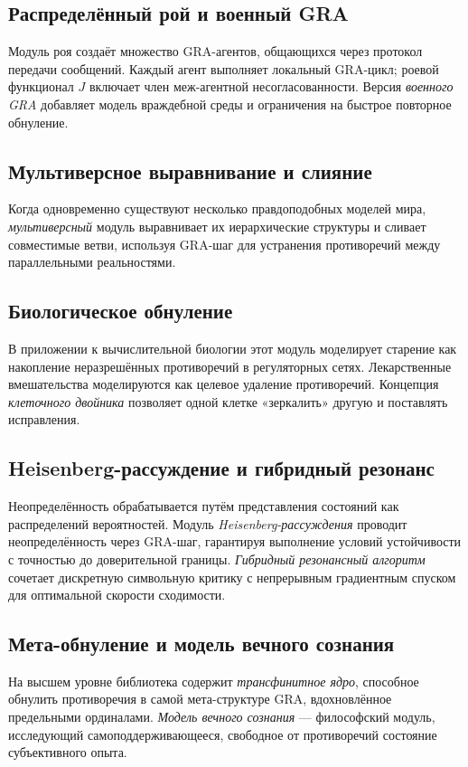 \documentclass[11pt,a4paper]{article}
\begin{document}
\subsection{Распределённый рой и военный GRA}
Модуль роя создаёт множество GRA-агентов, общающихся через протокол передачи сообщений. Каждый агент выполняет локальный GRA-цикл; роевой функционал $J$ включает член меж-агентной несогласованности. Версия \textit{военного GRA} добавляет модель враждебной среды и ограничения на быстрое повторное обнуление.

\subsection{Мультиверсное выравнивание и слияние}
Когда одновременно существуют несколько правдоподобных моделей мира, \textit{мультиверсный} модуль выравнивает их иерархические структуры и сливает совместимые ветви, используя GRA-шаг для устранения противоречий между параллельными реальностями.

\subsection{Биологическое обнуление}
В приложении к вычислительной биологии этот модуль моделирует старение как накопление неразрешённых противоречий в регуляторных сетях. Лекарственные вмешательства моделируются как целевое удаление противоречий. Концепция \textit{клеточного двойника} позволяет одной клетке «зеркалить» другую и поставлять исправления.

\subsection{Heisenberg-рассуждение и гибридный резонанс}
Неопределённость обрабатывается путём представления состояний как распределений вероятностей. Модуль \textit{Heisenberg-рассуждения} проводит неопределённость через GRA-шаг, гарантируя выполнение условий устойчивости с точностью до доверительной границы. \textit{Гибридный резонансный алгоритм} сочетает дискретную символьную критику с непрерывным градиентным спуском для оптимальной скорости сходимости.

\subsection{Мета-обнуление и модель вечного сознания}
На высшем уровне библиотека содержит \textit{трансфинитное ядро}, способное обнулить противоречия в самой мета-структуре GRA, вдохновлённое предельными ординалами. \textit{Модель вечного сознания} — философский модуль, исследующий самоподдерживающееся, свободное от противоречий состояние субъективного опыта.
\end{document}
